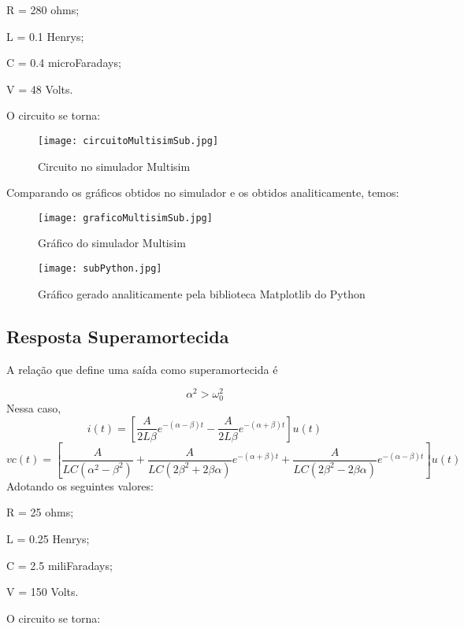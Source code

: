 \documentclass[12pt]{article}
\begin{document}
	R = 280 ohms; 
	
	L = 0.1 Henrys;
	 
	C = 0.4 microFaradays; 
	
	V = 48 Volts. 
	
	O circuito se torna:
	\begin{figure}[!h]
		\centering
		\texttt{[image: circuitoMultisimSub.jpg]}
		\caption{Circuito no simulador Multisim}
	\end{figure}
	
	Comparando os gráficos obtidos no simulador e os obtidos analiticamente, temos:
	\newline
	\newline
	\begin{figure}[!h]
		\centering
		\texttt{[image: graficoMultisimSub.jpg]}
		\caption{Gráfico do simulador Multisim}
	\end{figure}
	\begin{figure}[!h]
		\centering
		\texttt{[image: subPython.jpg]}
		\caption{Gráfico gerado analiticamente pela biblioteca Matplotlib do Python}

	\end{figure}
	\pagebreak
	\newline
	\subsection{Resposta Superamortecida}
	A relação que define uma saída como superamortecida é

	\begin{equation}
		\alpha^2 > \omega_0 ^2
	\end{equation}
	Nessa caso,
	\begin{equation}
		i(t) = [\frac{A}{2L\beta}e^{-(\alpha - \beta)t} - \frac{A}{2L\beta}e^{-(\alpha+\beta)t}]u(t)
	\end{equation}
	\begin{equation}
		vc(t) = [\frac{A}{LC(\alpha^2 - \beta^2)} + \frac{A}{LC(2\beta^2 + 2\beta\alpha)}e^{-(\alpha+\beta)t} + \frac{A}{LC(2\beta^2 - 2\beta\alpha)}e^{-(\alpha - \beta)t}]u(t)
	\end{equation}
	Adotando os seguintes valores: 
	
	R = 25 ohms; 
	
	L = 0.25 Henrys;
	
	C = 2.5 miliFaradays;
	
	V = 150 Volts. 
	
	O circuito se torna:
	
\end{document}
